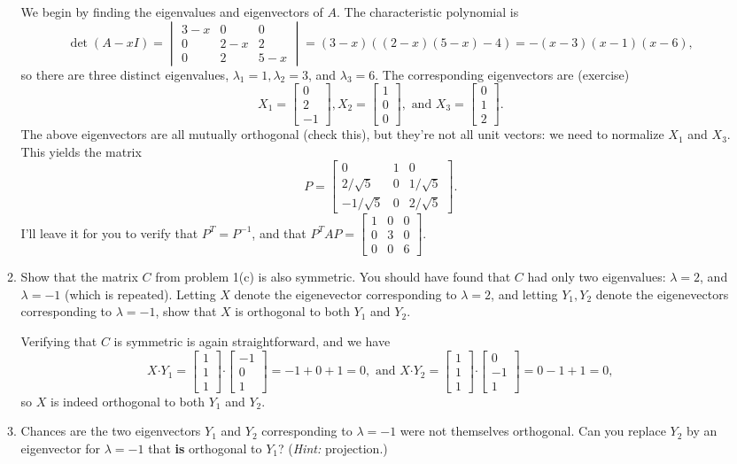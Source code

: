 \documentclass[12pt]{article}
\newcommand{\dotp}{\boldsymbol{\cdot}}
\newcommand{\bbm}{\begin{bmatrix}}
\newcommand{\ebm}{\end{bmatrix}}
\newcommand{\bvm}{\begin{vmatrix}}
\newcommand{\evm}{\end{vmatrix}}
\begin{document}
\begin{enumerate}
\begin{enumerate}
\bigskip

We begin by finding the eigenvalues and eigenvectors of $A$. The characteristic polynomial is
\[
 \det(A-xI) = \bvm 3-x&0&0\\0&2-x&2\\0&2&5-x\evm = (3-x)((2-x)(5-x)-4) = -(x-3)(x-1)(x-6),
\]
so there are three distinct eigenvalues, $\lambda_1 = 1, \lambda_2=3$, and $\lambda_3=6$. The corresponding eigenvectors are (exercise)
\[
 X_1 = \bbm 0\\2\\-1\ebm, X_2 = \bbm 1\\0\\0\ebm, \text{ and }  X_3 = \bbm 0\\1\\2\ebm.
\]
The above eigenvectors are all mutually orthogonal (check this), but they're not all unit vectors: we need to normalize $X_1$ and $X_3$. This yields the matrix
\[
 P = \bbm 0&1&0\\2/\sqrt{5}&0&1/\sqrt{5}\\-1/\sqrt{5}&0&2/\sqrt{5}\ebm.
\]
I'll leave it for you to verify that $P^T=P^{-1}$, and that $P^TAP=\bbm 1&0&0\\0&3&0\\0&0&6\ebm$.

 \item Show that the matrix $C$ from problem 1(c) is also symmetric. You should have found that $C$ had only two eigenvalues: $\lambda =2$, and $\lambda = -1$ (which is repeated). Letting $X$ denote the eigenevector corresponding to $\lambda=2$, and letting $Y_1, Y_2$ denote the eigenevectors corresponding to $\lambda = -1$, show that $X$ is orthogonal to both $Y_1$ and $Y_2$.

\bigskip

Verifying that $C$ is symmetric is again straightforward, and we have 
\[
 X\dotp Y_1 = \bbm 1\\1\\1\ebm \dotp \bbm -1\\0\\1\ebm = -1+0+1=0, \text{ and } X\dotp Y_2 = \bbm 1\\1\\1\ebm\dotp\bbm 0\\-1\\1\ebm = 0-1+1=0,
\]
so $X$ is indeed orthogonal to both $Y_1$ and $Y_2$. 
 \item Chances are the two eigenvectors $Y_1$ and $Y_2$ corresponding to $\lambda = -1$ were not themselves orthogonal. Can you replace $Y_2$ by an eigenvector for $\lambda = -1$ that \textbf{is} orthogonal to $Y_1$? (\textit{Hint:} projection.)


\end{enumerate}
\end{enumerate}
\end{document}
